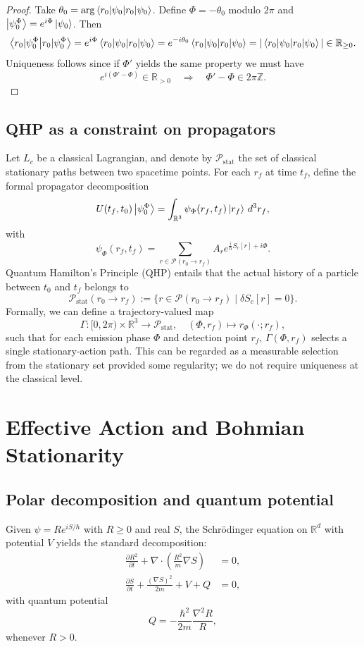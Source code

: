 \documentclass[11pt]{article}
\begin{document}
\begin{itemize}[leftmargin=*]
\begin{proof}
Take \(\theta_0 = \arg\braket{r_0|\psi_0}\).
Define \(\Phi = -\theta_0\) modulo \(2\pi\) and \(\ket{\psi_0^\Phi}=e^{i\Phi}\ket{\psi_0}\).
Then
\[
\braket{r_0|\psi_0^\Phi} = e^{i\Phi}\braket{r_0|\psi_0}
= e^{-i\theta_0}\braket{r_0|\psi_0}
= |\braket{r_0|\psi_0}|\in\mathbb{R}_{\ge 0}.
\]
Uniqueness follows since if \(\Phi'\) yields the same property we must have
\[
e^{i(\Phi'-\Phi)} \in \mathbb{R}_{>0}\quad\Rightarrow\quad \Phi'-\Phi\in 2\pi\mathbb{Z}.
\]
\end{proof}

\subsection{QHP as a constraint on propagators}

Let \(L_c\) be a classical Lagrangian, and denote by \(\mathcal{P}_{\mathrm{stat}}\) the set of classical stationary paths between two spacetime points.
For each \(r_f\) at time \(t_f\), define the formal propagator decomposition
\[
U(t_f,t_0)\ket{\psi_0^\Phi} = \int_{\mathbb{R}^3} \psi_\Phi(r_f,t_f)\ket{r_f}\,d^3r_f,
\]
with
\[
\psi_\Phi(r_f,t_f) = \sum_{r\in\mathcal{P}(r_0\to r_f)} A_r e^{\frac{i}{\hbar}S_c[r] + i\Phi}.
\]
Quantum Hamilton's Principle (QHP) entails that the actual history of a particle between \(t_0\) and \(t_f\) belongs to
\[
\mathcal{P}_{\mathrm{stat}}(r_0\to r_f) := \{r\in\mathcal{P}(r_0\to r_f)\mid \delta S_c[r]=0\}.
\]
Formally, we can define a trajectory-valued map
\[
\Gamma : [0,2\pi)\times \mathbb{R}^3 \to \mathcal{P}_{\mathrm{stat}},\quad
(\Phi,r_f)\mapsto r_\Phi(\cdot;r_f),
\]
such that for each emission phase \(\Phi\) and detection point \(r_f\), \(\Gamma(\Phi,r_f)\) selects a single stationary-action path.
This can be regarded as a measurable selection from the stationary set provided some regularity; we do not require uniqueness at the classical level.

\section{Effective Action and Bohmian Stationarity}

\subsection{Polar decomposition and quantum potential}

Given \(\psi = R e^{iS/\hbar}\) with \(R\ge0\) and real \(S\), the Schr\"odinger equation on \(\mathbb{R}^d\) with potential \(V\) yields the standard decomposition:
\begin{align}
\frac{\partial R^2}{\partial t} + \nabla\cdot\left(\frac{R^2}{m}\nabla S\right) &= 0,\label{eq:continuity-app}\\
\frac{\partial S}{\partial t} + \frac{(\nabla S)^2}{2m} + V + Q &= 0,\label{eq:HJQ-app}
\end{align}
with quantum potential
\begin{equation}
Q = -\frac{\hbar^2}{2m}\frac{\nabla^2 R}{R},
\end{equation}
whenever \(R>0\).


\end{itemize}
\end{document}

